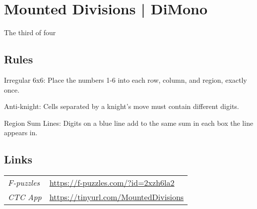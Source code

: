 \section[Mounted Divisions | DiMono {[\emph{6\emph{x}6 Irregular Anti-Knight Region Sum Lines}]}]{Mounted Divisions | {\normalfont DiMono}}
\label{sec:50-mounted-divisions-dimono}
The third of four
\subsection*{Rules}
\begin{markdown}
Irregular 6x6: Place the numbers 1-6 into each row, column, and region, exactly once.



Anti-knight: Cells separated by a knight's move must contain different digits.



Region Sum Lines: Digits on a blue line add to the same sum in each box the line appears in.
\end{markdown}
\subsection*{Links}
\begin{tabularx}{\textwidth}{l X}
\emph{F-puzzles} & \url{https://f-puzzles.com/?id=2xzh6la2} \\
\emph{CTC App} & \url{https://tinyurl.com/MountedDivisions} \\
\end{tabularx}
\pagebreak
